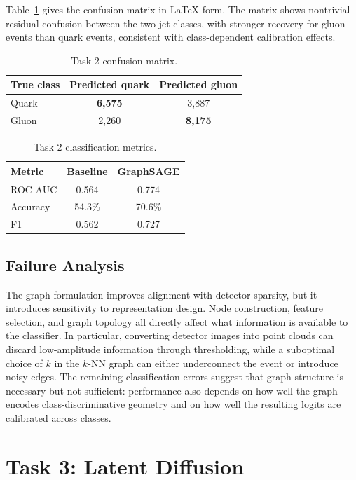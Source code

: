 \documentclass[11pt]{article}
\begin{document}
Table~\ref{tab:task2_confusion} gives the confusion matrix in LaTeX form. The matrix shows nontrivial residual confusion between the two jet classes, with stronger recovery for gluon events than quark events, consistent with class-dependent calibration effects.
\begin{table}[H]
\centering
\small
\caption{Task 2 confusion matrix.}
\begin{tabular}{lcc}
\toprule
\textbf{True class} & \textbf{Predicted quark} & \textbf{Predicted gluon} \\
\midrule
Quark & \textbf{6,575} & 3,887 \\
Gluon & 2,260 & \textbf{8,175} \\
\bottomrule
\end{tabular}
\label{tab:task2_confusion}
\end{table}

\begin{table}[H]
\centering
\small
\caption{Task 2 classification metrics.}
\begin{tabular}{lcc}
\toprule
\textbf{Metric} & \textbf{Baseline} & \textbf{GraphSAGE} \\
\midrule
ROC-AUC & 0.564 & 0.774 \\
Accuracy & 54.3\% & 70.6\% \\
F1 & 0.562 & 0.727 \\
\bottomrule
\end{tabular}
\label{tab:task2_results}
\end{table}

\subsection{Failure Analysis}
The graph formulation improves alignment with detector sparsity, but it introduces sensitivity to representation design. Node construction, feature selection, and graph topology all directly affect what information is available to the classifier. In particular, converting detector images into point clouds can discard low-amplitude information through thresholding, while a suboptimal choice of $k$ in the $k$-NN graph can either underconnect the event or introduce noisy edges. The remaining classification errors suggest that graph structure is necessary but not sufficient: performance also depends on how well the graph encodes class-discriminative geometry and on how well the resulting logits are calibrated across classes.

\section{Task 3: Latent Diffusion}
\end{document}
